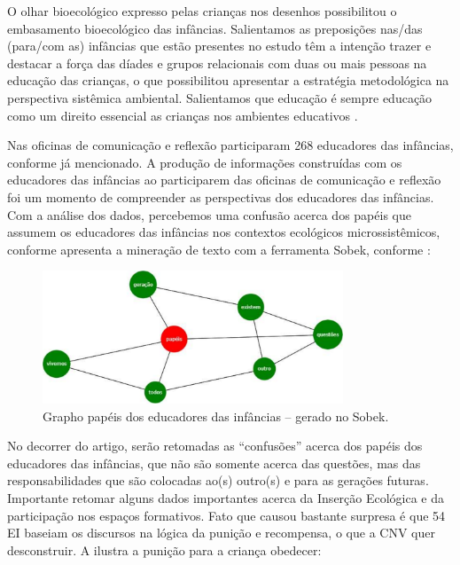 \documentclass{textolivre}
\begin{document}
O olhar bioecológico expresso pelas crianças nos desenhos possibilitou o embasamento bioecológico das infâncias. Salientamos as preposições nas/das (para/com as) infâncias que estão presentes no estudo têm a intenção trazer e destacar a força das díades e grupos relacionais com duas ou mais pessoas na educação das crianças, o que possibilitou apresentar a estratégia metodológica na perspectiva sistêmica ambiental. Salientamos que educação é sempre educação como um direito essencial as crianças nos ambientes educativos \cite{piske2019}. 

Nas oficinas de comunicação e reflexão participaram 268 educadores das infâncias, conforme já mencionado. A produção de informações construídas com os educadores das infâncias ao participarem das oficinas de comunicação e reflexão foi um momento de compreender as perspectivas dos educadores das infâncias. Com a análise dos dados, percebemos uma confusão acerca dos papéis que assumem os educadores das infâncias nos contextos ecológicos microssistêmicos, conforme apresenta a mineração de texto com a ferramenta Sobek, conforme :

\begin{figure}[h!]
 \centering
 \includegraphics[width=0.8\textwidth]{figure07.pdf}
 \caption{Grapho papéis dos educadores das infâncias -- gerado no Sobek.}
 \label{fig-fig07}
\end{figure}


No decorrer do artigo, serão retomadas as “confusões” acerca dos papéis dos educadores das infâncias, que não são somente acerca das questões, mas das responsabilidades que são colocadas ao(s) outro(s) e para as gerações futuras. Importante retomar alguns dados importantes acerca da Inserção Ecológica e da participação nos espaços formativos. Fato que causou bastante surpresa é que 54 EI baseiam os discursos na lógica da punição e recompensa, o que a CNV quer desconstruir. A  ilustra a punição para a criança obedecer: 
\end{document}
